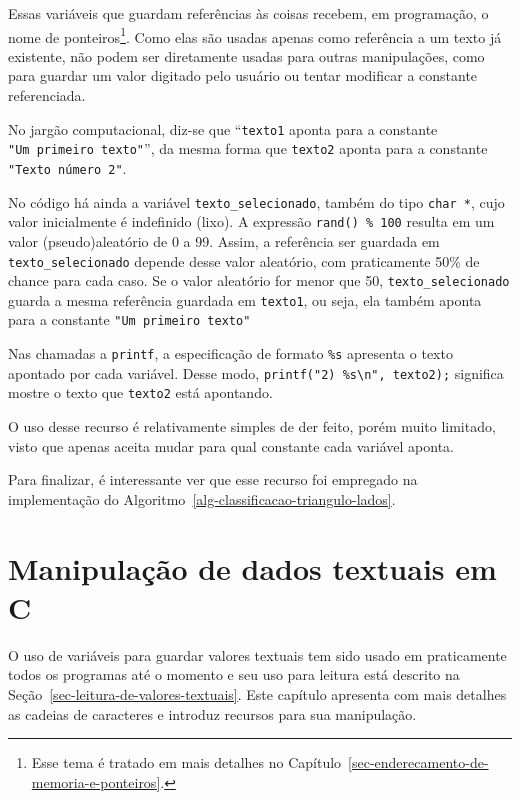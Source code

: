 \documentclass[
  11pt,
  a4paper,
]{scrbook}
\begin{document}
Essas variáveis que guardam referências às coisas recebem, em
programação, o nome de ponteiros\footnote{Esse tema é tratado em mais
  detalhes no Capítulo~\ref{sec-enderecamento-de-memoria-e-ponteiros}.}.
Como elas são usadas apenas como referência a um texto já existente, não
podem ser diretamente usadas para outras manipulações, como para guardar
um valor digitado pelo usuário ou tentar modificar a constante
referenciada.

No jargão computacional, diz-se que ``\texttt{texto1} aponta para a
constante \texttt{"Um\ primeiro\ texto"}'', da mesma forma que
\texttt{texto2} aponta para a constante \texttt{"Texto\ número\ 2"}.

No código há ainda a variável \texttt{texto\_selecionado}, também do
tipo \texttt{char\ *}, cujo valor inicialmente é indefinido (lixo). A
expressão \texttt{rand()\ \%\ 100} resulta em um valor (pseudo)aleatório
de 0 a 99. Assim, a referência ser guardada em
\texttt{texto\_selecionado} depende desse valor aleatório, com
praticamente 50\% de chance para cada caso. Se o valor aleatório for
menor que 50, \texttt{texto\_selecionado} guarda a mesma referência
guardada em \texttt{texto1}, ou seja, ela também aponta para a constante
\texttt{"Um\ primeiro\ texto"}

Nas chamadas a \texttt{printf}, a especificação de formato \texttt{\%s}
apresenta o texto apontado por cada variável. Desse modo,
\texttt{printf("2)\ \%s\textbackslash{}n",\ texto2);} significa mostre o
texto que \texttt{texto2} está apontando.

O uso desse recurso é relativamente simples de der feito, porém muito
limitado, visto que apenas aceita mudar para qual constante cada
variável aponta.

Para finalizar, é interessante ver que esse recurso foi empregado na
implementação do Algoritmo~\ref{alg-classificacao-triangulo-lados}.

\chapter{Manipulação de dados textuais em
C}\label{sec-manipulacao-de-dados-textuais}

O uso de variáveis para guardar valores textuais tem sido usado em
praticamente todos os programas até o momento e seu uso para leitura
está descrito na Seção~\ref{sec-leitura-de-valores-textuais}. Este
capítulo apresenta com mais detalhes as cadeias de caracteres e introduz
recursos para sua manipulação.
\end{document}
